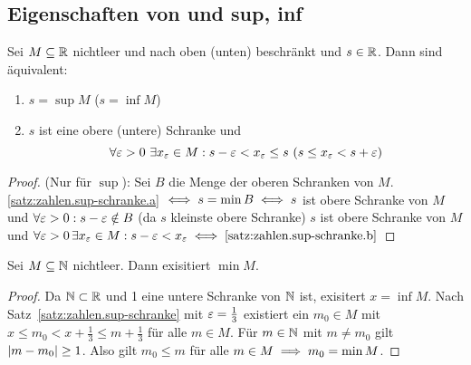 \documentclass[12pt]{scrreprt}
\begin{document}
\subsection*{Eigenschaften von  und sup, inf}
\begin{satz}\label{satz:zahlen.sup-schranke}
Sei $M \subseteq \mathbb{R}$ nichtleer und nach oben (unten) beschränkt
und $s \in \mathbb{R}$. Dann sind äquivalent:
\begin{enumerate}
\item \label{satz:zahlen.sup-schranke.a} 
$s = \sup M$ ($s = \inf M$)
\item \label{satz:zahlen.sup-schranke.b}
$s$ ist eine obere (untere) Schranke und 
\[\forall \varepsilon > 0\ \exists x_\varepsilon \in M: s - \varepsilon < x_\varepsilon \le s \ ( s \le x_\varepsilon < s+\varepsilon)\]
\end{enumerate}
\end{satz}
\begin{proof}
(Nur für $\sup$):
Sei $B$ die Menge der oberen Schranken von $M$.
\ref{satz:zahlen.sup-schranke.a} $\iff s= \min B \iff s$ ist obere Schranke von $M$ und $\forall \varepsilon > 0 : s - \varepsilon \notin B$
(da $s$ kleinste obere Schranke) \gdw $s$ ist obere Schranke von $M$ und 
$\forall \varepsilon > 0\,\exists x_\varepsilon \in M: s-\varepsilon < x_\varepsilon \iff \ref{satz:zahlen.sup-schranke.b}$
\end{proof}

\begin{satz}\label{satz:zahlen.min-in-nat}
Sei $M \subseteq \mathbb{N}$ nichtleer. Dann exisitiert $\min M$.
\end{satz}
\begin{proof}
Da $\mathbb{N} \subset \mathbb{R}$ und 1 eine untere Schranke von $\mathbb{N}$ ist,
exisitert $x = \inf M$. Nach Satz~\ref{satz:zahlen.sup-schranke} mit $\varepsilon = \frac{1}{3}$ existiert
ein $m_0 \in M$ mit $ x \le m_0 < x + \frac{1}{3} \le m + \frac{1}{3}$ für alle $ m \in M$.
Für $m \in \mathbb{N}$ mit $m \ne m_0$ gilt $\left\lvert m - m_0\right\lvert \ge 1$. Also gilt $m_0 \le m$ für alle $ m\in M \implies m_0 = \min M$.
\end{proof}
\end{document}
